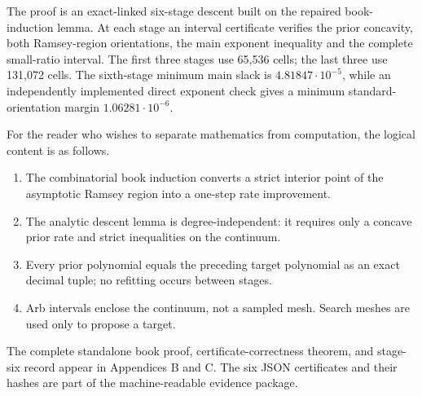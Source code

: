 The proof is an exact-linked six-stage descent built on the repaired
book-induction lemma.  At each stage an interval certificate verifies the
prior concavity, both Ramsey-region orientations, the main exponent
inequality and the complete small-ratio interval.  The first three stages use
65,536 cells; the last three use 131,072 cells.  The sixth-stage minimum
main slack is \(4.81847\cdot10^{-5}\), while an independently implemented
direct exponent check gives a minimum standard-orientation margin
\(1.06281\cdot10^{-6}\).

For the reader who wishes to separate mathematics from computation, the
logical content is as follows.

\begin{enumerate}[label=(\roman*)]
\item The combinatorial book induction converts a strict interior point of
      the asymptotic Ramsey region into a one-step rate improvement.
\item The analytic descent lemma is degree-independent: it requires only a
      concave prior rate and strict inequalities on the continuum.
\item Every prior polynomial equals the preceding target polynomial as an
      exact decimal tuple; no refitting occurs between stages.
\item Arb intervals enclose the continuum, not a sampled mesh.  Search meshes
      are used only to propose a target.
\end{enumerate}

The complete standalone book proof, certificate-correctness theorem, and
stage-six record appear in Appendices B and C.  The six JSON certificates and
their hashes are part of the machine-readable evidence package.
